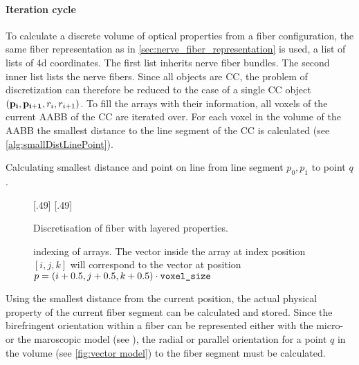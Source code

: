 \paragraph{Iteration cycle}
To calculate a discrete volume of optical properties from a fiber configuration, the same fiber representation as in \cref{sec:nerve_fiber_representation} is used, \ie{} a list of lists of 4d coordinates.
The first list inherits nerve fiber bundles.
The second inner list lists the nerve fibers.
Since all objects are \ac{CC}, the problem of discretization can therefore be reduced to the case of a single \ac{CC} object $(\mathbf{p_i}, \mathbf{p_{i+1}}, r_i, r_{i+1})$.
% 
To fill the arrays with their information, all voxels of the current \ac{AABB} of the \ac{CC} are iterated over.
For each voxel in the volume of the \ac{AABB} the smallest distance to the line segment of the \ac{CC} is calculated (see \cref{alg:smallDistLinePoint}).
\\
% 
\begin{lstfloat}[!tb]

\caption[Calculating smallest distance between line segment and point]{Calculating smallest distance and point on line from line segment $p_0, p_1$ to point $q$.}
\label{alg:smallDistLinePoint}
\end{lstfloat}
% 
\begin{figure}[!t]
\centering
\setlength{\tikzwidth}{0.45\textwidth}
[.49\textwidth]{
} \hfill
{}[.49\textwidth]{
}
\caption{Discretisation of fiber with layered properties.}
\label{fig:fiber_discretisation}
\end{figure}
% 
\begin{figure}[!t]
\centering
\def\tikzwidth{0.42\textwidth}
\caption{indexing of arrays.
The vector inside the array at index position $[i,j,k]$ will correspond to the vector at position $p=(i+0.5,j+0.5,k+0.5)\cdot \mathit{\texttt{voxel\_size}}$}
\label{fig:indexing_array}
\end{figure}
% 
Using the smallest distance from the current position, the actual physical property of the current fiber segment can be calculated and stored.
Since the birefringent orientation within a fiber can be represented either with the micro- or the maroscopic model (see \dummy{}), the radial or parallel orientation for a point $q$ in the volume (see \cref{fig:vector model}) to the fiber segment must be calculated.
